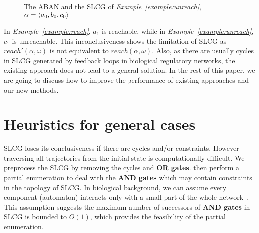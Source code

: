 \documentclass{article}
\theoremstyle{definition}
\DeclarePairedDelimiter{\init}{\langle}{\rangle}
\begin{document}
\begin{figure}[ht]
\centering

\caption{The ABAN and the SLCG of \textit{Example~\ref{example:unreach}}, $\alpha=\init{ a_0,b_0,c_0}$}
\label{fig:3}
\end{figure}
In \textit{Example~\ref{example:reach}}, $a_1$ is reachable, while in \textit{Example~\ref{example:unreach}}, $c_1$ is unreachable. This inconclusiveness shows the limitation of SLCG as $reach'(\alpha,\omega)$ is not equivalent to $reach(\alpha,\omega)$.
Also, as there are usually cycles in SLCG generated by feedback loops in biological regulatory networks, the existing approach does not lead to a general solution.
In the rest of this paper, we are going to discuss how to improve the performance of existing approaches and our new methods. 

\section{Heuristics for general cases}\label{sect:4}
SLCG loses its conclusiveness if there are cycles and/or constraints.
However traversing all trajectories from the initial state is computationally difficult. 
We preprocess the SLCG by removing the cycles and \textbf{OR gates}.
then perform a partial enumeration to deal with the \textbf{AND gates} which may contain constraints in the topology of SLCG.
In biological background, we can assume every component (automaton) interacts only with a small part of the whole network~\cite{akutsu2007control}.
This assumption suggests the maximum number of successors of \textbf{AND gates} in SLCG is bounded to $O(1)$, which provides the feasibility of the partial enumeration.
\end{document}
